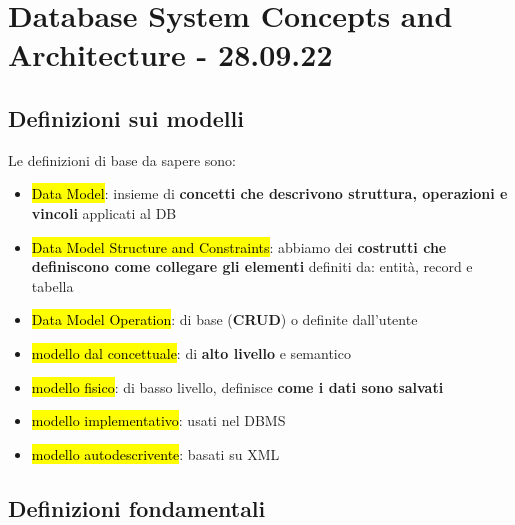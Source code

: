 \newpage
\section{Database System Concepts and Architecture - 28.09.22}

\subsection{Definizioni sui modelli}

Le definizioni di base da sapere sono:

\begin{itemize}
	\item \hl{Data Model}: insieme di \textbf{concetti che descrivono struttura, operazioni e vincoli} applicati al DB
	
	\item \hl{Data Model Structure and Constraints}: abbiamo dei \textbf{costrutti che definiscono come collegare gli elementi} definiti da: entità, record e tabella

	\item \hl{Data Model Operation}: di base (\textbf{CRUD}) o definite dall'utente

	\item \hl{modello dal concettuale}: di \textbf{alto livello} e semantico
	
	\item \hl{modello fisico}: di basso livello, definisce \textbf{come i dati sono salvati}
	
	\item \hl{modello implementativo}: usati nel DBMS 
	
	\item \hl{modello autodescrivente}: basati su XML 

\end{itemize}


\subsection{Definizioni fondamentali}

